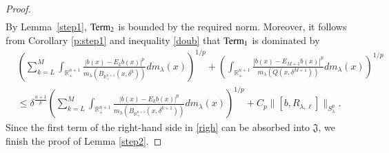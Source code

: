 \documentclass[12pt]{amsart}
\begin{document}
\begin{proof}
\begin{align*}
\end{align*}
By Lemma~\ref{step1}, $ {\textup{Term}_{2}}$ is bounded by the required norm. Moreover, it follows from Corollary \ref{p:step1} and inequality \eqref{doub} that ${\textup{Term}_{1}}$ is dominated by
\begin{align}\label{righ}
&\left(\sum_{k=L}^{M}\int_{\mathbb{R}_{+}^{n+1}}\frac{|b(x)-E_{k}b(x)|^{p}}{m_\lambda(B_{\mathbb{R}_+^{n+1}}(x,\delta^{k}))}dm_\lambda(x)\right)^{1/p}+\left(\int_{\mathbb{R}_{+}^{n+1}}\frac{|b(x)-E_{M+1}b(x)|^{p}}{m_\lambda(Q(x,\delta^{M+1}))}dm_\lambda(x)\right)^{1/p}\nonumber\\
&\leq {\delta^{\frac{n+1}{p}}} \left(\sum_{k=L}^{M}\int_{\mathbb{R}_{+}^{n+1}}\frac{|b(x)-E_{k}b(x)|^{p}}{m_\lambda(B_{\mathbb{R}_+^{n+1}}(x,\delta^{k+1}))}dm_\lambda(x)\right)^{1/p}+C_p\|[b,R_{\lambda,\ell}]\|_{S_\lambda^p}.
\end{align}
Since the first term of the right-hand side in \eqref{righ} can be absorbed into $ \mathfrak J$, we finish the proof of Lemma \ref{step2}.
  \end{proof}
\end{document}
